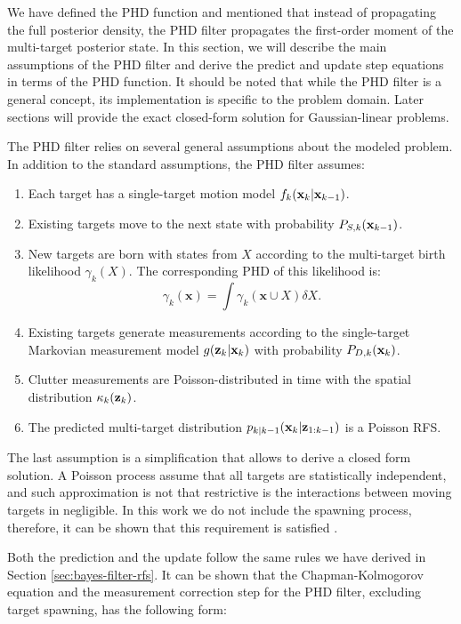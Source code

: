 We have defined the PHD function and mentioned that instead of propagating the full posterior density, the PHD filter propagates the first-order moment of the multi-target posterior state. In this section, we will describe the main assumptions of the PHD filter and derive the predict and update step equations in terms of the PHD function. It should be noted that while the PHD filter is a general concept, its implementation is specific to the problem domain. Later sections will provide the exact closed-form solution for Gaussian-linear problems.

The PHD filter relies on several general assumptions about the modeled problem. In addition to the standard assumptions, the PHD filter assumes:

\begin{enumerate}
\item Each target has a single-target motion model $f_k(\vecat{x}{k} | \vecat{x}{k-1})$.
\item Existing targets move to the next state with probability $P_{S,k}(\vecat{x}{k-1})$.
\item New targets are born with states from $X$ according to the multi-target birth likelihood $\gamma_k(X)$. The corresponding PHD of this likelihood is:
\begin{equation}
\gamma_k(\mathbf{x}) = \int \gamma_k({\mathbf{x}} \cup X) \delta X.
\end{equation}
\item Existing targets generate measurements according to the single-target Markovian measurement model $g(\vecat{z}{k} | \vecat{x}{k})$ with probability $P_{D,k}(\vecat{x}{k})$.
\item Clutter measurements are Poisson-distributed in time with the spatial distribution $\kappa_k(\vecat{z}{k})$.
\item The predicted multi-target distribution $p_{k|k-1}(\vecat{x}{k} | \vecat{z}{1:k-1})$ is a Poisson RFS.
\end{enumerate}

The last assumption is a simplification that allows to derive a closed form solution. A Poisson process assume that all targets are statistically independent, and such approximation is not that restrictive is the interactions between moving targets in negligible. In this work we do not include the spawning process, therefore, it can be shown that this requirement is satisfied \cite{voGaussianMixtureProbability2006}.

Both the prediction and the update follow the same rules we have derived in Section \ref{sec:bayes-filter-rfs}. It can be shown that the Chapman-Kolmogorov equation and the measurement correction step for the PHD filter, excluding target spawning, has the following form:

